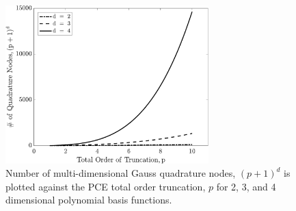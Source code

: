 \begin{figure}[htbp]
 \begin{center}
  \includegraphics[width=0.70\textwidth]{./Figures/curse}
\caption{Number of multi-dimensional Gauss quadrature nodes, $(p+1)^d$ is plotted against the PCE
 total order truncation, $p$ for 2, 3, and 4 dimensional polynomial basis functions.}
\label{fig:curse}
\end{center}
\end{figure}




